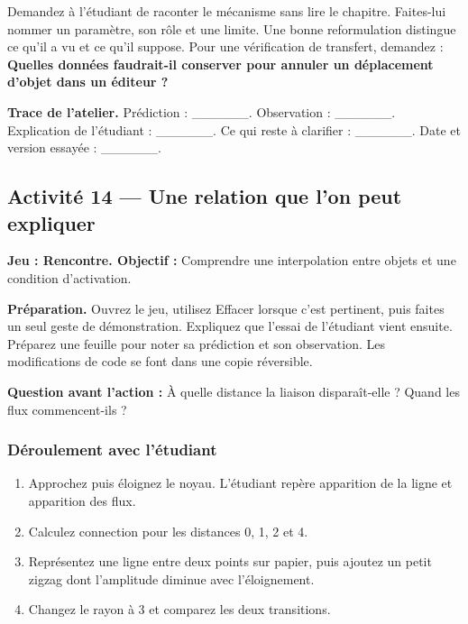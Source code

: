 \documentclass[
  canadien,
  11pt,
  letterpaper,
]{article}
\providecommand{\tightlist}{%
  \setlength{\itemsep}{0pt}\setlength{\parskip}{0pt}}
\begin{document}
Demandez à l'étudiant de raconter le mécanisme sans lire le chapitre.
Faites-lui nommer un paramètre, son rôle et une limite. Une bonne
reformulation distingue ce qu'il a vu et ce qu'il suppose. Pour une
vérification de transfert, demandez : \textbf{Quelles données
faudrait-il conserver pour annuler un déplacement d'objet dans un
éditeur ?}

\textbf{Trace de l'atelier.} Prédiction : \_\_\_\_\_\_. Observation :
\_\_\_\_\_\_. Explication de l'étudiant : \_\_\_\_\_\_. Ce qui reste à
clarifier : \_\_\_\_\_\_. Date et version essayée : \_\_\_\_\_\_.

\subsection{Activité 14 --- Une relation que l'on peut
expliquer}\label{activituxe9-14-une-relation-que-lon-peut-expliquer}

\textbf{Jeu : Rencontre. Objectif :} Comprendre une interpolation entre
objets et une condition d'activation.

\textbf{Préparation.} Ouvrez le jeu, utilisez Effacer lorsque c'est
pertinent, puis faites un seul geste de démonstration. Expliquez que
l'essai de l'étudiant vient ensuite. Préparez une feuille pour noter sa
prédiction et son observation. Les modifications de code se font dans
une copie réversible.

\textbf{Question avant l'action :} À quelle distance la liaison
disparaît-elle ? Quand les flux commencent-ils ?

\subsubsection{Déroulement avec
l'étudiant}\label{duxe9roulement-avec-luxe9tudiant-13}

\begin{enumerate}
\def\labelenumi{\arabic{enumi}.}
\tightlist
\item
  Approchez puis éloignez le noyau. L'étudiant repère apparition de la
  ligne et apparition des flux.
\item
  Calculez connection pour les distances 0, 1, 2 et 4.
\item
  Représentez une ligne entre deux points sur papier, puis ajoutez un
  petit zigzag dont l'amplitude diminue avec l'éloignement.
\item
  Changez le rayon à 3 et comparez les deux transitions.
\end{enumerate}
\end{document}
